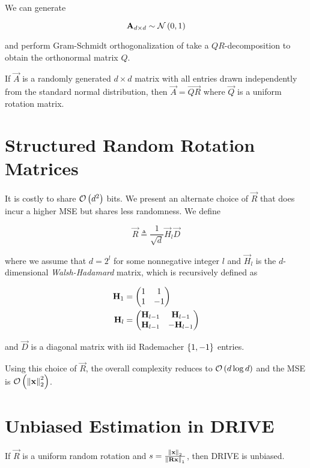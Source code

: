 \documentclass[twoside]{article}
\begin{document}
We can generate

\begin{equation}
    \boldsymbol{\mathbf{A}}_{d\times d} \sim \mathcal N\left(0,1\right)
    \label{eq:A-def}
\end{equation}

and perform Gram-Schmidt orthogonalization of take a \(QR\)-decomposition to 
obtain the orthonormal matrix \(Q\).

\begin{lemma}
    If \(\vec{A}\) is a randomly generated \(d\times d\) matrix with all 
    entries drawn independently from the standard normal distribution, then
    \(\vec{A}=\vec{QR}\) where \(\vec{Q}\) is a uniform rotation matrix.
\end{lemma}

\section{Structured Random Rotation Matrices}

It is costly to share \(\mathcal O\left(d^2\right)\) bits. We present an alternate choice of
\(\vec{R}\) that does incur a higher MSE but shares less randomness. We define

\begin{equation}
\vec{R} \triangleq \frac{1}{\sqrt{d}}\vec{H}_l\vec{D}
    \label{eq:r-alt-def}
\end{equation}

where we assume that \(d = 2^l\) for some nonnegative integer \(l\) and \(\vec{H}_l\)
is the \(d\)-dimensional \emph{Walsh-Hadamard} matrix, which is recursively defined
as

\begin{align}
    \boldsymbol{\mathbf{H}}_1 &= \begin{pmatrix}1 & 1 \\ 1 & -1\end{pmatrix} \\
    \boldsymbol{\mathbf{H}}_l &= \begin{pmatrix}\boldsymbol{\mathbf{H}}_{l-1} & \boldsymbol{\mathbf{H}}_{l-1} \\ \boldsymbol{\mathbf{H}}_{l-1} & -\boldsymbol{\mathbf{H}}_{l-1}\end{pmatrix}
    \label{eq:wh-def}
\end{align}

and \(\vec{D}\) is a diagonal matrix with iid Rademacher \(\left\{1,-1\right\}\) entries.

Using this choice of \(\vec{R}\), the overall complexity reduces to \(\mathcal O\left(d\log{d}\right)\) and the MSE is \(\mathcal O\left(\left\lVert\boldsymbol{\mathbf{x}}\right\rVert_2^2\right)\).

\section{Unbiased Estimation in DRIVE}

\begin{claim}
    If \(\vec{R}\) is a uniform random rotation and \(s = \frac{\left\lVert\boldsymbol{\mathbf{x}}\right\rVert_2}{\left\lVert\boldsymbol{\mathbf{Rx}}\right\rVert_1}\), then DRIVE is unbiased.
\end{claim}
\end{document}

